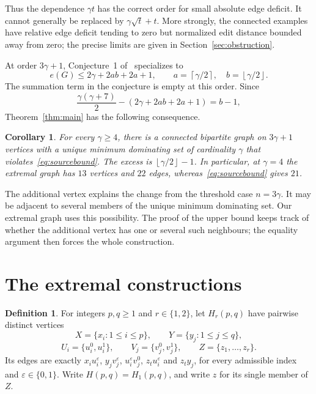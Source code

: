 \documentclass[11pt]{article}
\newtheorem{corollary}[theorem]{Corollary}
\theoremstyle{definition}
\newtheorem{definition}[theorem]{Definition}
\theoremstyle{remark}
\newcommand{\e}{e}
\newcommand{\ceil}[1]{\left\lceil#1\right\rceil}
\newcommand{\floor}[1]{\left\lfloor#1\right\rfloor}
\begin{document}
Thus the dependence $\gamma t$ has the correct order for small absolute
edge deficit. It cannot generally be replaced by $\gamma\sqrt t+t$.
More strongly, the connected examples have relative edge deficit tending
to zero but normalized edit distance bounded away from zero; the precise
limits are given in Section~\ref{sec:obstruction}.


At order $3\gamma+1$, Conjecture~1 of~\cite{KN} specializes to
\begin{equation}\label{eq:sourcebound}
 \e(G)\le 2\gamma+2ab+2a+1,
 \qquad a=\ceil{\gamma/2},\quad b=\floor{\gamma/2}.
\end{equation}
The summation term in the conjecture is empty at this order. Since
\begin{equation}\label{eq:gap}
 \frac{\gamma(\gamma+7)}2-(2\gamma+2ab+2a+1)=b-1,
\end{equation}
Theorem~\ref{thm:main} has the following consequence.

\begin{corollary}\label{cor:counter}
For every $\gamma\ge4$, there is a connected bipartite graph on $3\gamma+1$
vertices with a unique minimum dominating set of cardinality $\gamma$ that
violates~\eqref{eq:sourcebound}. The excess is $\floor{\gamma/2}-1$.
In particular, at $\gamma=4$ the extremal graph has $13$ vertices and $22$
edges, whereas~\eqref{eq:sourcebound} gives $21$.
\end{corollary}

The additional vertex explains the change from the threshold case $n=3\gamma$.
It may be adjacent to several members of the unique minimum dominating set.
Our extremal graph uses this possibility. The proof of the upper bound keeps
track of whether the additional vertex has one or several such neighbours;
the equality argument then forces the whole construction.

\section{The extremal constructions}\label{sec:construction}

\begin{definition}\label{def:H}
For integers $p,q\ge1$ and $r\in\{1,2\}$, let $H_r(p,q)$ have pairwise
 distinct vertices
\[
 X=\{x_i:1\le i\le p\},\qquad Y=\{y_j:1\le j\le q\},
\]
\[
 U_i=\{u_i^0,u_i^1\},\qquad V_j=\{v_j^0,v_j^1\},\qquad
 Z=\{z_1,\ldots,z_r\}.
\]
Its edges are exactly $x_i u_i^\varepsilon$, $y_j v_j^\varepsilon$,
$u_i^\varepsilon v_j^0$, $z_tu_i^\varepsilon$ and $z_ty_j$, for every
admissible index and $\varepsilon\in\{0,1\}$. Write $H(p,q)=H_1(p,q)$,
and write $z$ for its single member of $Z$.
\end{definition}
\end{document}
